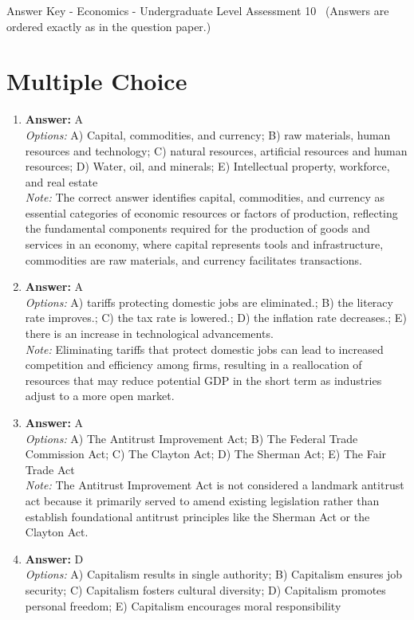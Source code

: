 \documentclass[12pt]{article}
\begin{document}
\begin{center}
Answer Key - Economics - Undergraduate Level Assessment 10 \
\small (Answers are ordered exactly as in the question paper.)
\end{center}

\section*{Multiple Choice}
\begin{enumerate}[label=\arabic*.]
\item \textbf{Answer:} A
\\ \textit{Options:} A) Capital, commodities, and currency; B) raw materials, human resources and technology; C) natural resources, artificial resources and human resources; D) Water, oil, and minerals; E) Intellectual property, workforce, and real estate
\\ \textit{Note:} The correct answer identifies capital, commodities, and currency as essential categories of economic resources or factors of production, reflecting the fundamental components required for the production of goods and services in an economy, where capital represents tools and infrastructure, commodities are raw materials, and currency facilitates transactions.
\item \textbf{Answer:} A
\\ \textit{Options:} A) tariffs protecting domestic jobs are eliminated.; B) the literacy rate improves.; C) the tax rate is lowered.; D) the inflation rate decreases.; E) there is an increase in technological advancements.
\\ \textit{Note:} Eliminating tariffs that protect domestic jobs can lead to increased competition and efficiency among firms, resulting in a reallocation of resources that may reduce potential GDP in the short term as industries adjust to a more open market.
\item \textbf{Answer:} A
\\ \textit{Options:} A) The Antitrust Improvement Act; B) The Federal Trade Commission Act; C) The Clayton Act; D) The Sherman Act; E) The Fair Trade Act
\\ \textit{Note:} The Antitrust Improvement Act is not considered a landmark antitrust act because it primarily served to amend existing legislation rather than establish foundational antitrust principles like the Sherman Act or the Clayton Act.
\item \textbf{Answer:} D
\\ \textit{Options:} A) Capitalism results in single authority; B) Capitalism ensures job security; C) Capitalism fosters cultural diversity; D) Capitalism promotes personal freedom; E) Capitalism encourages moral responsibility

\end{enumerate}
\end{document}
